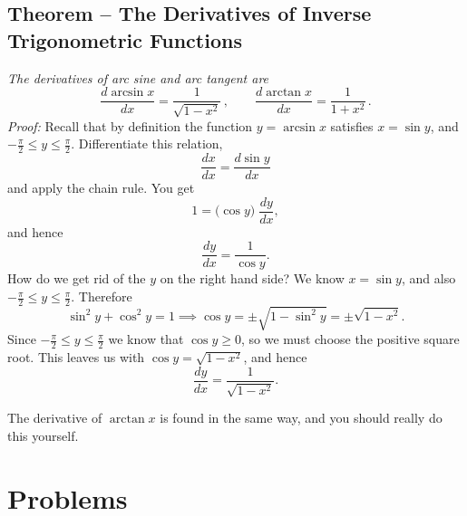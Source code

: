 \subsection{Theorem -- The Derivatives of Inverse Trigonometric Functions} 
\textit{ The derivatives of arc sine and arc tangent are }
\[
  \frac{d\arcsin x}{dx} = \frac 1{\sqrt{1-x^2}}\,, \qquad
  \frac{d\arctan x}{dx} = \frac 1{1+x^2}\,.
\]
\textit{Proof: } Recall that by definition the function $y =\arcsin x$
satisfies $x=\sin y$, and $-\frac\pi2 \leq y \leq \frac\pi2$.
Differentiate this relation,
\[
\frac{dx}{dx} = \frac{d\sin y}{dx}
\]
and apply the chain rule.  You get
\[
1 = \bigl(\cos y\bigr)\; \frac{dy}{dx},
\]
and hence
\[
\frac{dy}{dx} = \frac1{\cos y}.
\]
How do we get rid of the $y$ on the right hand side? We know $x=\sin
y$, and also $-\frac\pi2\leq y \leq \frac\pi2$.  Therefore
\[
\sin^2 y + \cos^2 y = 1 \implies \cos y = \pm\sqrt{1-\sin^2y} =
\pm\sqrt{1-x^2}.
\]
Since $-\frac\pi2\leq y \leq \frac\pi2$ we know that $\cos y\geq 0$,
so we must choose the positive square root.  This leaves us with $\cos
y = \sqrt{1-x^2}$, and hence
\[
\frac{dy}{dx} = \frac1{\sqrt{1-x^2}}.
\]




The derivative of $\arctan x$ is found in the same way, and you should
really do this yourself.




\section{Problems} 
\problemfont 




